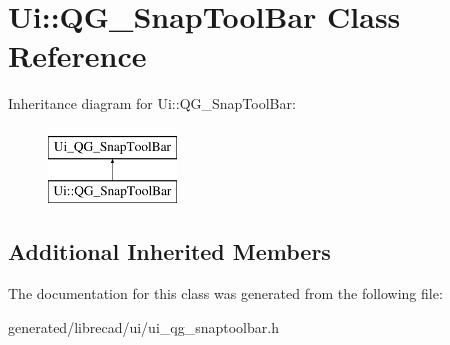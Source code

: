 \hypertarget{classUi_1_1QG__SnapToolBar}{\section{Ui\-:\-:Q\-G\-\_\-\-Snap\-Tool\-Bar Class Reference}
\label{classUi_1_1QG__SnapToolBar}
}
Inheritance diagram for Ui\-:\-:Q\-G\-\_\-\-Snap\-Tool\-Bar\-:\begin{figure}[H]
\begin{center}
\leavevmode
\includegraphics[height=2.000000cm]{classUi_1_1QG__SnapToolBar}
\end{center}
\end{figure}
\subsection*{Additional Inherited Members}


The documentation for this class was generated from the following file\-:\begin{DoxyCompactItemize}
\item 
generated/librecad/ui/ui\-\_\-qg\-\_\-snaptoolbar.\-h\end{DoxyCompactItemize}
